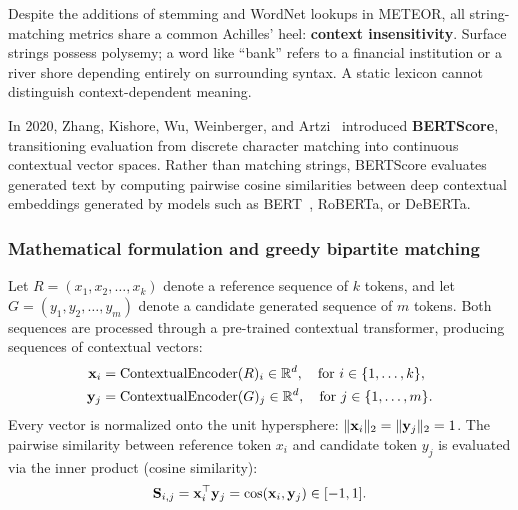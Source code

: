 \documentclass[../../../main.tex]{subfiles}
\begin{document}
Despite the additions of stemming and WordNet lookups in METEOR, all string-matching metrics share a common Achilles' heel: \textbf{context insensitivity}. Surface strings possess polysemy; a word like ``bank'' refers to a financial institution or a river shore depending entirely on surrounding syntax. A static lexicon cannot distinguish context-dependent meaning.

In 2020, Zhang, Kishore, Wu, Weinberger, and Artzi~\cite{zhang2020bertscore} introduced \textbf{BERTScore}, transitioning evaluation from discrete character matching into continuous contextual vector spaces. Rather than matching strings, BERTScore evaluates generated text by computing pairwise cosine similarities between deep contextual embeddings generated by models such as BERT~\cite{devlin2019}, RoBERTa, or DeBERTa.

\subsubsection{Mathematical formulation and greedy bipartite matching}
Let $R = (x_1, x_2, \dots, x_k)$ denote a reference sequence of $k$ tokens, and let $G = (y_1, y_2, \dots, y_m)$ denote a candidate generated sequence of $m$ tokens. Both sequences are processed through a pre-trained contextual transformer, producing sequences of contextual vectors:
\begin{align}
\mathbf{x}_i &= \text{ContextualEncoder}(R)_i \in \mathbb{R}^d, \quad \text{for } i \in \{1, \dots, k\}, \\
\mathbf{y}_j &= \text{ContextualEncoder}(G)_j \in \mathbb{R}^d, \quad \text{for } j \in \{1, \dots, m\}.
\end{align}
Every vector is normalized onto the unit hypersphere: $\lVert\mathbf{x}_i\rVert_2 = \lVert\mathbf{y}_j\rVert_2 = 1$. The pairwise similarity between reference token $x_i$ and candidate token $y_j$ is evaluated via the inner product (cosine similarity):
\begin{equation}
\label{eq:bertscore_pairwise_sim}
\mathbf{S}_{i, j} = \mathbf{x}_i^\top \mathbf{y}_j = \cos(\mathbf{x}_i, \mathbf{y}_j) \in [-1, 1].
\end{equation}
\end{document}
